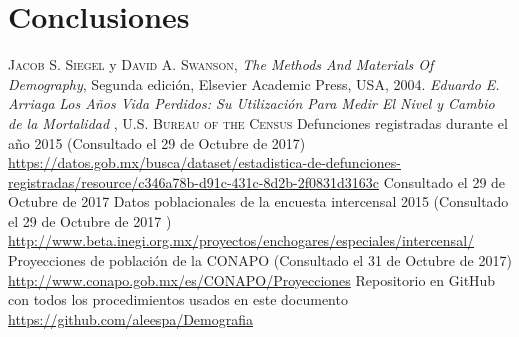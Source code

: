 \documentclass[fontsize=11pt]{article}
\begin{document}
\section*{Conclusiones}
\begin{thebibliography}{X}
 \textsc{Jacob S. Siegel} y \textsc{David A. Swanson}, \textit{The Methods And
Materials Of Demography}, Segunda edición,
Elsevier Academic Press, USA, 2004.
 \textit{Eduardo E. Arriaga}\textit{ Los Años Vida Perdidos: Su Utilización Para Medir El Nivel y Cambio de la Mortalidad} , \textsc{U.S. Bureau of the Census} 
 Defunciones registradas durante el año 2015 (Consultado el 29 de Octubre de 2017)  \url{https://datos.gob.mx/busca/dataset/estadistica-de-defunciones-registradas/resource/c346a78b-d91c-431c-8d2b-2f0831d3163c} Consultado el 29 de Octubre de 2017 
 Datos poblacionales de la encuesta intercensal 2015 (Consultado el 29 de Octubre de 2017 ) \url{http://www.beta.inegi.org.mx/proyectos/enchogares/especiales/intercensal/} 
 Proyecciones de población de la CONAPO (Consultado el 31 de Octubre de 2017) \url{http://www.conapo.gob.mx/es/CONAPO/Proyecciones} 
 Repositorio en GitHub con todos los procedimientos usados en este documento \url{https://github.com/aleespa/Demografia}
\end{thebibliography}
\end{document}

